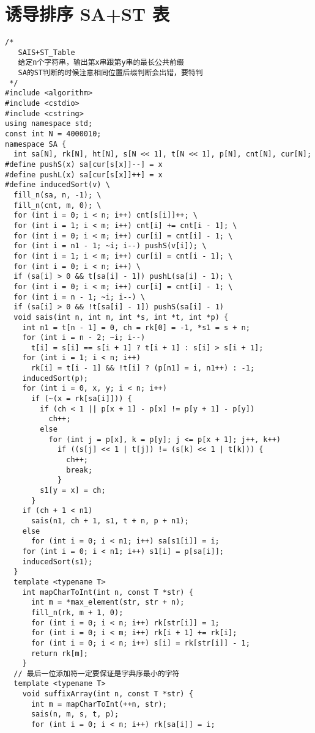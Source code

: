 \section{ 诱导排序 SA+ST 表}
\begin{lstlisting}
/*
   SAIS+ST_Table
   给定n个字符串，输出第x串跟第y串的最长公共前缀
   SA的ST判断的时候注意相同位置后缀判断会出错，要特判
 */
#include <algorithm>
#include <cstdio>
#include <cstring>
using namespace std;
const int N = 4000010;
namespace SA {
  int sa[N], rk[N], ht[N], s[N << 1], t[N << 1], p[N], cnt[N], cur[N];
#define pushS(x) sa[cur[s[x]]--] = x
#define pushL(x) sa[cur[s[x]]++] = x
#define inducedSort(v) \
  fill_n(sa, n, -1); \
  fill_n(cnt, m, 0); \
  for (int i = 0; i < n; i++) cnt[s[i]]++; \
  for (int i = 1; i < m; i++) cnt[i] += cnt[i - 1]; \
  for (int i = 0; i < m; i++) cur[i] = cnt[i] - 1; \
  for (int i = n1 - 1; ~i; i--) pushS(v[i]); \
  for (int i = 1; i < m; i++) cur[i] = cnt[i - 1]; \
  for (int i = 0; i < n; i++) \
  if (sa[i] > 0 && t[sa[i] - 1]) pushL(sa[i] - 1); \
  for (int i = 0; i < m; i++) cur[i] = cnt[i] - 1; \
  for (int i = n - 1; ~i; i--) \
  if (sa[i] > 0 && !t[sa[i] - 1]) pushS(sa[i] - 1)
  void sais(int n, int m, int *s, int *t, int *p) {
    int n1 = t[n - 1] = 0, ch = rk[0] = -1, *s1 = s + n;
    for (int i = n - 2; ~i; i--)
      t[i] = s[i] == s[i + 1] ? t[i + 1] : s[i] > s[i + 1];
    for (int i = 1; i < n; i++)
      rk[i] = t[i - 1] && !t[i] ? (p[n1] = i, n1++) : -1;
    inducedSort(p);
    for (int i = 0, x, y; i < n; i++)
      if (~(x = rk[sa[i]])) {
        if (ch < 1 || p[x + 1] - p[x] != p[y + 1] - p[y])
          ch++;
        else
          for (int j = p[x], k = p[y]; j <= p[x + 1]; j++, k++)
            if ((s[j] << 1 | t[j]) != (s[k] << 1 | t[k])) {
              ch++;
              break;
            }
        s1[y = x] = ch;
      }
    if (ch + 1 < n1)
      sais(n1, ch + 1, s1, t + n, p + n1);
    else
      for (int i = 0; i < n1; i++) sa[s1[i]] = i;
    for (int i = 0; i < n1; i++) s1[i] = p[sa[i]];
    inducedSort(s1);
  }
  template <typename T>
    int mapCharToInt(int n, const T *str) {
      int m = *max_element(str, str + n);
      fill_n(rk, m + 1, 0);
      for (int i = 0; i < n; i++) rk[str[i]] = 1;
      for (int i = 0; i < m; i++) rk[i + 1] += rk[i];
      for (int i = 0; i < n; i++) s[i] = rk[str[i]] - 1;
      return rk[m];
    }
  // 最后一位添加符一定要保证是字典序最小的字符
  template <typename T>
    void suffixArray(int n, const T *str) {
      int m = mapCharToInt(++n, str);
      sais(n, m, s, t, p);
      for (int i = 0; i < n; i++) rk[sa[i]] = i;

\end{lstlisting}

